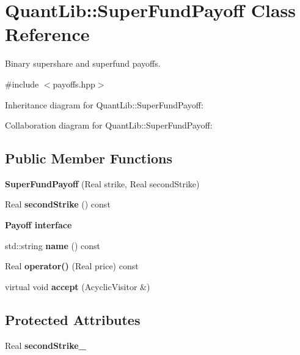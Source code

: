 \section{Quant\+Lib\+:\+:Super\+Fund\+Payoff Class Reference}
\label{class_quant_lib_1_1_super_fund_payoff}


Binary supershare and superfund payoffs.  




{\ttfamily \#include $<$payoffs.\+hpp$>$}



Inheritance diagram for Quant\+Lib\+:\+:Super\+Fund\+Payoff\+:


Collaboration diagram for Quant\+Lib\+:\+:Super\+Fund\+Payoff\+:
\subsection*{Public Member Functions}
\begin{DoxyCompactItemize}
\item 
{\bfseries Super\+Fund\+Payoff} (Real strike, Real second\+Strike)\label{class_quant_lib_1_1_super_fund_payoff_a8bbe9b70d7760f8a1c98ba052c21f104}

\item 
Real {\bfseries second\+Strike} () const \label{class_quant_lib_1_1_super_fund_payoff_ac9c0f2442928944972487bf489db6c94}

\end{DoxyCompactItemize}
\begin{Indent}{\bf Payoff interface}\par
\begin{DoxyCompactItemize}
\item 
std\+::string {\bfseries name} () const \label{class_quant_lib_1_1_super_fund_payoff_afc8a814f6f3e19d897de52a2d904ab06}

\item 
Real {\bfseries operator()} (Real price) const \label{class_quant_lib_1_1_super_fund_payoff_ada88e7398980e3dfd2a74c90cf67df12}

\item 
virtual void {\bfseries accept} (Acyclic\+Visitor \&)\label{class_quant_lib_1_1_super_fund_payoff_a3d4274ffe43a4cb46a2defae6642637a}

\end{DoxyCompactItemize}
\end{Indent}
\subsection*{Protected Attributes}
\begin{DoxyCompactItemize}
\item 
Real {\bfseries second\+Strike\+\_\+}\label{class_quant_lib_1_1_super_fund_payoff_a4296144d0ddbb6ed61618cc0ed6722d1}

\end{DoxyCompactItemize}
